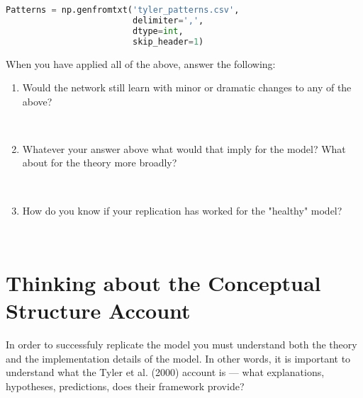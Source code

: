 \documentclass[a4paper,10pt]{article}
\begin{document}
\begin{lstlisting}[language=Python]
Patterns = np.genfromtxt('tyler_patterns.csv',
                         delimiter=',',
                         dtype=int,
                         skip_header=1)
\end{lstlisting}

When you have applied all of the above, answer the following:

\begin{enumerate}

\item Would the network still learn with minor or dramatic changes to any of the above?

\ \\

\item Whatever your answer above what would that imply for the model? What about for the theory more broadly?

\ \\

\item How do you know if your replication has worked for the "healthy" model?

\ \\

\end{enumerate}

\section{Thinking about the Conceptual Structure Account}
In order to successfuly replicate the model you must understand both the theory and the implementation details of the model. In other words, it is important to understand what the Tyler et al. (2000) account is --- what explanations, hypotheses, predictions, does their framework provide?
\end{document}
